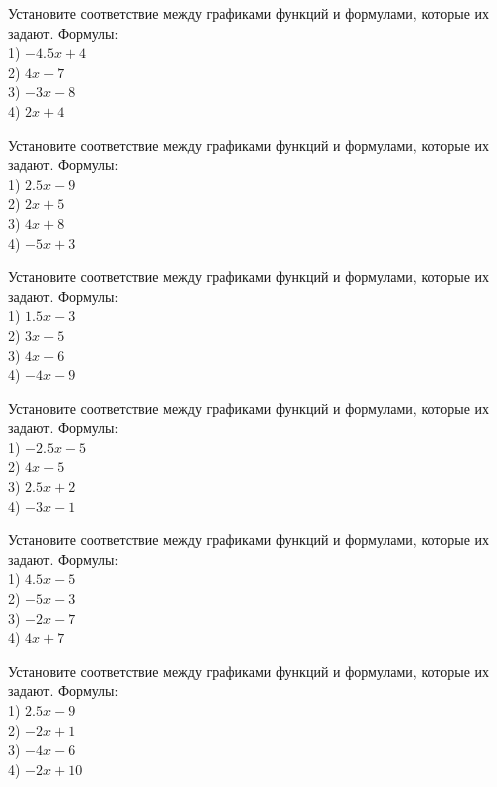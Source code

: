 \documentclass[4apaper]{article}
\begin{document}
\begin{taskBN}{73}
Установите соответствие между графиками функций и формулами, которые их задают. Формулы: \\1) $-4.5x+4$\\2) $4x-7$\\3) $-3x-8$\\4) $2x+4$
\end{taskBN}

\begin{taskBN}{74}
Установите соответствие между графиками функций и формулами, которые их задают. Формулы: \\1) $2.5x-9$\\2) $2x+5$\\3) $4x+8$\\4) $-5x+3$
\end{taskBN}

\begin{taskBN}{75}
Установите соответствие между графиками функций и формулами, которые их задают. Формулы: \\1) $1.5x-3$\\2) $3x-5$\\3) $4x-6$\\4) $-4x-9$
\end{taskBN}

\begin{taskBN}{76}
Установите соответствие между графиками функций и формулами, которые их задают. Формулы: \\1) $-2.5x-5$\\2) $4x-5$\\3) $2.5x+2$\\4) $-3x-1$
\end{taskBN}

\begin{taskBN}{77}
Установите соответствие между графиками функций и формулами, которые их задают. Формулы: \\1) $4.5x-5$\\2) $-5x-3$\\3) $-2x-7$\\4) $4x+7$
\end{taskBN}

\begin{taskBN}{78}
Установите соответствие между графиками функций и формулами, которые их задают. Формулы: \\1) $2.5x-9$\\2) $-2x+1$\\3) $-4x-6$\\4) $-2x+10$
\end{taskBN}
\end{document}
